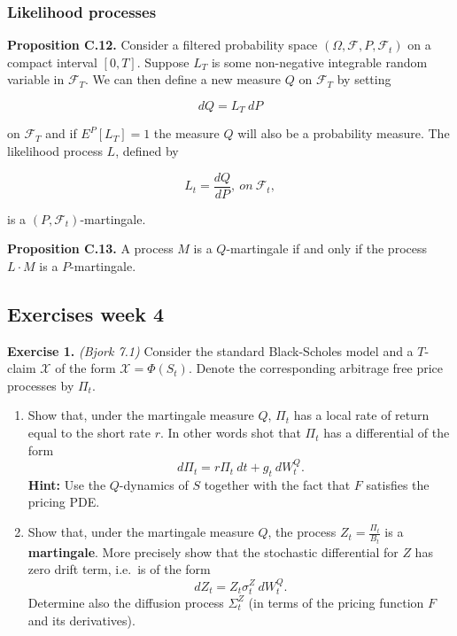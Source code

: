 \documentclass[
]{article}
\providecommand{\tightlist}{%
  \setlength{\itemsep}{0pt}\setlength{\parskip}{0pt}}
\begin{document}
\hypertarget{likelihood-processes}{%
\subsubsection{Likelihood processes}\label{likelihood-processes}}

\textbf{Proposition C.12.} Consider a filtered probability space
\((\Omega, \mathcal{F},P,\mathcal{F}_t)\) on a compact interval
\([0,T]\). Suppose \(L_T\) is some non-negative integrable random
variable in \(\mathcal{F}_T\). We can then define a new measure \(Q\) on
\(\mathcal{F}_T\) by setting

\[
dQ=L_T\ dP
\]

on \(\mathcal{F}_T\) and if \(E^P[L_T]=1\) the measure \(Q\) will also
be a probability measure. The likelihood process \(L\), defined by

\[
L_t=\frac{dQ}{dP},\ on\ \mathcal{F}_t,
\]

is a \((P,\mathcal{F}_t)\)-martingale.

\textbf{Proposition C.13.} A process \(M\) is a \(Q\)-martingale if and
only if the process \(L\cdot M\) is a \(P\)-martingale.

\hypertarget{exercises-week-4}{%
\subsection{Exercises week 4}\label{exercises-week-4}}

\textbf{Exercise 1.} \emph{(Bjork 7.1)} Consider the standard
Black-Scholes model and a \(T\)-claim \(\mathcal{X}\) of the form
\(\mathcal{X}=\Phi(S_t)\). Denote the corresponding arbitrage free price
processes by \(\Pi_t\).

\begin{enumerate}
\def\labelenumi{\alph{enumi}.}
\tightlist
\item
  Show that, under the martingale measure \(Q\), \(\Pi_t\) has a local
  rate of return equal to the short rate \(r\). In other words shot that
  \(\Pi_t\) has a differential of the form \[
    d\Pi_t=r\Pi_t\ dt+g_t\ dW_t^Q.
    \] \textbf{Hint:} Use the \(Q\)-dynamics of \(S\) together with the
  fact that \(F\) satisfies the pricing PDE.
\item
  Show that, under the martingale measure \(Q\), the process
  \(Z_t=\frac{\Pi_t}{B_t}\) is a \textbf{martingale}. More precisely
  show that the stochastic differential for \(Z\) has zero drift term,
  i.e.~is of the form \[
    dZ_t=Z_t\sigma_t^Z\ dW_t^Q.
    \] Determine also the diffusion process \(\Sigma_t^Z\) (in terms of
  the pricing function \(F\) and its derivatives).
\end{enumerate}
\end{document}
